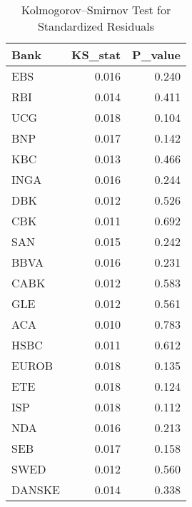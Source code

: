 \begin{table}

\caption{Kolmogorov–Smirnov Test for Standardized Residuals}
\centering
\begin{tabular}[t]{lrr}
\toprule
Bank & KS\_stat & P\_value\\
\midrule
EBS & 0.016 & 0.240\\
RBI & 0.014 & 0.411\\
UCG & 0.018 & 0.104\\
BNP & 0.017 & 0.142\\
KBC & 0.013 & 0.466\\
\addlinespace
INGA & 0.016 & 0.244\\
DBK & 0.012 & 0.526\\
CBK & 0.011 & 0.692\\
SAN & 0.015 & 0.242\\
BBVA & 0.016 & 0.231\\
\addlinespace
CABK & 0.012 & 0.583\\
GLE & 0.012 & 0.561\\
ACA & 0.010 & 0.783\\
HSBC & 0.011 & 0.612\\
EUROB & 0.018 & 0.135\\
\addlinespace
ETE & 0.018 & 0.124\\
ISP & 0.018 & 0.112\\
NDA & 0.016 & 0.213\\
SEB & 0.017 & 0.158\\
SWED & 0.012 & 0.560\\
\addlinespace
DANSKE & 0.014 & 0.338\\
\bottomrule
\end{tabular}
\end{table}
